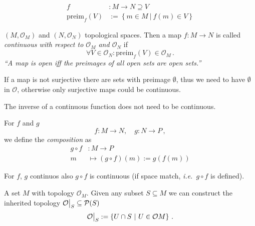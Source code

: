 \documentclass[11pt, a4paper, twocolumn]{article} %
\begin{document}
\begin{defn}[Preimage]
    \begin{align}
        f&: M \to N \supseteq V \nonumber \\
        \text{preim}_f(V) &:= \left\{ m\in M~|~f(m) \in V \right\}
    \end{align}
\end{defn}

\begin{defn}[Continuity]
    $(M, \mathcal{O}_M)$ and $(N, \mathcal{O}_N)$ topological spaces.
    Then a map $f: M \to N$ is called \textit{continuous with respect to $\mathcal{O}_M$ and
    $\mathcal{O}_N$} if
    \begin{equation}
        \boxed{
    \forall V\in \mathcal{O}_N: \text{preim}_f(V) \in \mathcal{O}_M
}\,.
    \end{equation}
    \textit{``A map is open iff the preimages of all open sets are open sets.''}
\end{defn}

\begin{note}
    If a map is not surjective there are sets with preimage $\emptyset$, thus we need to have
    $\emptyset$ in $\mathcal{O}$, otherwise only surjective maps could be continuous.
\end{note}
\begin{note}
    The inverse of a continuous function does not need to be continuous.
\end{note}

\begin{defn}
    For $f$ and $g$
    \begin{equation*}
        f: M \to N, \quad g: N \to P\,,
    \end{equation*}
    we define the \textit{composition} as
    \begin{align}
        g \circ f&: M \to P \\
        m &\mapsto (g\circ f)(m) := g(f(m)) \nonumber
    \end{align}
\end{defn}

\begin{theorem}
    For $f$, $g$ continuos also $g\circ f$ is continuous (if space match, \textit{i.e.}\ $g\circ f$ is defined).
\end{theorem}


\begin{defn}
    A set $M$ with topology $\mathcal{O}_M$. Given any subset $S \subseteq M$ we
    can construct the inherited topology $\mathcal{O}\big|_S \subseteq \mathcal{P}(S)$
    \begin{equation}
        \mathcal{O}\big|_S := \left\{ U\cap S~|~U\in \mathcal{O}M \right\}\,.
    \end{equation}
\end{defn}
\end{document}
